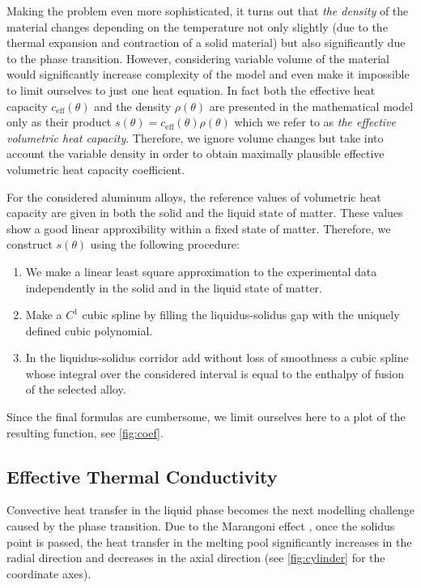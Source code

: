 Making the problem even more sophisticated, it turns out that \emph{the density} of the material changes depending on the temperature not only slightly (due to the thermal expansion and contraction of a solid material) but also significantly due to the phase transition. However, considering variable volume of the material would significantly increase complexity of the model and even make it impossible to limit ourselves to just one heat equation. In fact both the effective heat capacity $c_\text{eff}(\theta)$ and the density $\rho(\theta)$ are presented in the mathematical model only as their product $s(\theta) = c_\text{eff}(\theta) \rho(\theta)$ which we refer to as \emph{the effective volumetric heat capacity}. Therefore, we ignore volume changes but take into account the variable density in order to obtain maximally plausible effective volumetric heat capacity coefficient.

For the considered aluminum alloys, the reference values of volumetric heat capacity are given in both the solid and the liquid state of matter. These values show a good linear approxibility within a fixed state of matter. Therefore, we construct $s(\theta)$ using the following procedure:
\begin{enumerate}
	\item We make a linear least square approximation to the experimental data independently in the solid and in the liquid state of matter.
	\item Make a $C^1$ cubic spline by filling the liquidus-solidus gap with the uniquely defined cubic polynomial.
	\item In the liquidus-solidus corridor add without loss of smoothness a cubic spline whose integral over the considered interval is equal to the enthalpy of fusion of the selected alloy.
\end{enumerate}

Since the final formulas are cumbersome, we limit ourselves here to a plot of the resulting function, see \cref{fig:coef}.


\subsection{Effective Thermal Conductivity}
\label{subsec:conductivity}

Convective heat transfer in the liquid phase becomes the next modelling challenge caused by the phase transition. Due to the Marangoni effect , once the solidus point is passed, the heat transfer in the melting pool significantly increases in the radial direction and decreases in the axial direction (see \cref{fig:cylinder} for the coordinate axes).

